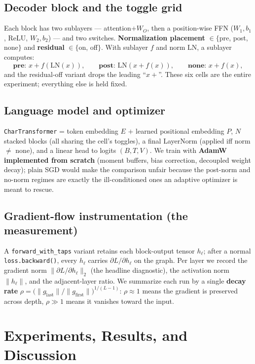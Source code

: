 \documentclass{article}
\begin{document}
\subsection{Decoder block and the toggle grid} Each block has two sublayers — attention$+W_O$, then a position-wise FFN ($W_1,b_1$, ReLU, $W_2,b_2$) — and two switches. \textbf{Normalization placement} $\in\{$pre, post, none$\}$ and \textbf{residual} $\in\{$on, off$\}$. With sublayer $f$ and norm $\mathrm{LN}$, a sublayer computes:
\[
\textbf{pre: } x + f(\mathrm{LN}(x)),\qquad
\textbf{post: } \mathrm{LN}(x + f(x)),\qquad
\textbf{none: } x + f(x),
\]
and the residual-off variant drops the leading ``$x+$''. These six cells are the entire experiment; everything else is held fixed.

\subsection{Language model and optimizer} \texttt{CharTransformer} = token embedding $E$ $+$ learned positional embedding $P$, $N$ stacked blocks (all sharing the cell's toggles), a final LayerNorm (applied iff norm $\neq$ none), and a linear head to logits $(B,T,V)$. We train with \textbf{AdamW implemented from scratch} (moment buffers, bias correction, decoupled weight decay); plain SGD would make the comparison unfair because the post-norm and no-norm regimes are exactly the ill-conditioned ones an adaptive optimizer is meant to rescue.

\subsection{Gradient-flow instrumentation (the measurement)} A \texttt{forward\_with\_taps} variant retains each block-output tensor $h_\ell$; after a normal \texttt{loss.backward()}, every $h_\ell$ carries $\partial L/\partial h_\ell$ on the graph. Per layer we record the gradient norm $\lVert\partial L/\partial h_\ell\rVert_2$ (the headline diagnostic), the activation norm $\lVert h_\ell\rVert$, and the adjacent-layer ratio. We summarize each run by a single \textbf{decay rate} $\rho=\big(\lVert g_{\text{last}}\rVert/\lVert g_{\text{first}}\rVert\big)^{1/(L-1)}$: $\rho\!\approx\!1$ means the gradient is preserved across depth, $\rho\!\gg\!1$ means it vanishes toward the input.

\section{Experiments, Results, and Discussion}
\end{document}
